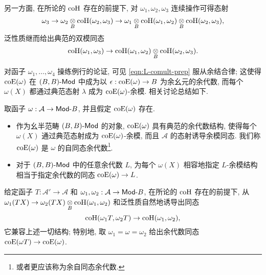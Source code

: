 另一方面, 在所论的 $\operatorname{coH}$ 存在的前提下, 对 $\omega_1, \omega_2, \omega_3$ 连续操作可得态射
\begin{equation*}
	\omega_3 \to \omega_2 \underset{B}{\otimes} \operatorname{coH}(\omega_2, \omega_3) \to \omega_1 \underset{B}{\otimes} \operatorname{coH}(\omega_1, \omega_2) \underset{B}{\otimes} \operatorname{coH}(\omega_2, \omega_3),
\end{equation*}
泛性质继而给出典范的双模同态
\begin{equation}\label{eqn:L-comult-prep}
	\operatorname{coH}(\omega_1, \omega_3) \to \operatorname{coH}(\omega_1, \omega_2) \underset{B}{\otimes} \operatorname{coH}(\omega_2, \omega_3).
\end{equation}

对函子 $\omega_1, \ldots, \omega_4$ 操练例行的论证, 可见 \eqref{eqn:L-comult-prep} 服从余结合律; 这使得 $\operatorname{coE}(\omega)$ 在 $(B, B)\text{-}\mathsf{Mod}$ 中成为以 $\epsilon: \operatorname{coE}(\omega) \to B$ 为余幺元的余代数, 而每个 $\omega(X)$ 都通过典范态射 $\lambda$ 成为 $\operatorname{coE}(\omega)$-余模. 相关讨论总结如下.

\begin{definition-proposition}[自同态余代数]\label{def:cogebra-L}
	取函子 $\omega: \mathcal{A} \to \mathsf{Mod}\text{-}B$, 并且假定 $\operatorname{coE}(\omega)$ 存在.
	\begin{itemize}
		\item 作为幺半范畴 $(B, B)\text{-}\mathsf{Mod}$ 的对象, $\operatorname{coE}(\omega)$ 具有典范的余代数结构, 使得每个 $\omega(X)$ 通过典范态射成为 $\operatorname{coE}(\omega)$-余模, 而且 $\mathcal{A}$ 的态射诱导余模同态. 我们称 $\operatorname{coE}(\omega)$ 是 $\omega$ 的自同态余代数\footnote{或者更应该称为余自同态余代数.}.
		\item 对于 $(B, B)\text{-}\mathsf{Mod}$ 中的任意余代数 $L$, 为每个 $\omega(X)$ 相容地指定 $L$-余模结构相当于指定余代数的同态 $\operatorname{coE}(\omega) \to L$.
	\end{itemize}
\end{definition-proposition}

\begin{remark}\label{rem:L-cogebra-functoriality}
	给定函子 $T: \mathcal{A}' \to \mathcal{A}$ 和 $\omega_1, \omega_2: \mathcal{A} \to \mathsf{Mod}\text{-}B$, 在所论的 $\operatorname{coH}$ 存在的前提下, 从 $\omega_1(TX) \to \omega_2(TX) \underset{B}{\otimes} \operatorname{coH}(\omega_1, \omega_2)$ 和泛性质自然地诱导出同态
	\[ \operatorname{coH}(\omega_1 T, \omega_2 T) \to \operatorname{coH}(\omega_1, \omega_2), \]
	它兼容上述一切结构; 特别地, 取 $\omega_1 = \omega = \omega_2$ 给出余代数同态 $\operatorname{coE}(\omega T) \to \operatorname{coE}(\omega)$.
\end{remark}

